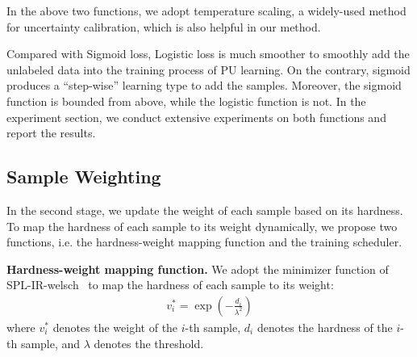 \documentclass[sigconf]{acmart}
\begin{document}
 



In the above two functions, we adopt temperature scaling, a widely-used method for uncertainty calibration, which is also helpful in our method.

Compared with Sigmoid loss, Logistic loss is much smoother to smoothly add the unlabeled data into the training process of PU learning. On the contrary, sigmoid produces a ``step-wise'' learning type to add the samples. Moreover, the sigmoid function is bounded from above, while the logistic function is not. In the experiment section, we conduct extensive experiments on both functions and report the results.


\subsection{Sample Weighting}

In the second stage, we update the weight of each sample based on its hardness. To map the hardness of each sample to its weight dynamically, we propose two functions, i.e. the hardness-weight mapping function and the training scheduler.

\textbf{Hardness-weight mapping function.}
We adopt the minimizer function of SPL-IR-welsch~\cite{fan2017self} to map the hardness of each sample to its weight:
\begin{align}
    v_i^*=\exp(-\frac{d_i}{\lambda^2})\label{eq:wei}
\end{align}
where $v_i^*$ denotes the weight of the $i$-th sample, $d_i$ denotes the hardness of the $i$-th sample, and $\lambda$ denotes the threshold.
\end{document}
